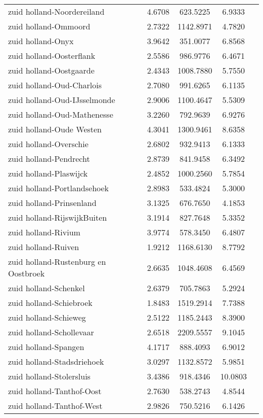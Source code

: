 \begin{longtable}{llccc}
zuid holland-Noordereiland & 4.6708 & 623.5225 & 6.9333 \\
zuid holland-Ommoord & 2.7322 & 1142.8971 & 4.7820 \\
zuid holland-Onyx & 3.9642 & 351.0077 & 6.8568 \\
zuid holland-Oosterflank & 2.5586 & 986.9776 & 6.4671 \\
zuid holland-Oostgaarde & 2.4343 & 1008.7880 & 5.7550 \\
zuid holland-Oud-Charlois & 2.7080 & 991.6265 & 6.1135 \\
zuid holland-Oud-IJsselmonde & 2.9006 & 1100.4647 & 5.5309 \\
zuid holland-Oud-Mathenesse & 3.2260 & 792.9639 & 6.9276 \\
zuid holland-Oude Westen & 4.3041 & 1300.9461 & 8.6358 \\
zuid holland-Overschie & 2.6802 & 932.9413 & 6.1333 \\
zuid holland-Pendrecht & 2.8739 & 841.9458 & 6.3492 \\
zuid holland-Plaswijck & 2.4852 & 1000.2560 & 5.7854 \\
zuid holland-Portlandsehoek & 2.8983 & 533.4824 & 5.3000 \\
zuid holland-Prinsenland & 3.1325 & 676.7650 & 4.1853 \\
zuid holland-RijswijkBuiten & 3.1914 & 827.7648 & 5.3352 \\
zuid holland-Rivium & 3.9774 & 578.3450 & 6.4807 \\
zuid holland-Ruiven & 1.9212 & 1168.6130 & 8.7792 \\
zuid holland-Rustenburg en Oostbroek & 2.6635 & 1048.4608 & 6.4569 \\
zuid holland-Schenkel & 2.6379 & 705.7863 & 5.2924 \\
zuid holland-Schiebroek & 1.8483 & 1519.2914 & 7.7388 \\
zuid holland-Schieweg & 2.5122 & 1185.2443 & 8.3900 \\
zuid holland-Schollevaar & 2.6518 & 2209.5557 & 9.1045 \\
zuid holland-Spangen & 4.1717 & 888.4093 & 6.9012 \\
zuid holland-Stadsdriehoek & 3.0297 & 1132.8572 & 5.9851 \\
zuid holland-Stolersluis & 3.4386 & 918.4346 & 10.0803 \\
zuid holland-Tanthof-Oost & 2.7630 & 538.2743 & 4.8544 \\
zuid holland-Tanthof-West & 2.9826 & 750.5216 & 6.1426 \\

\end{longtable}
